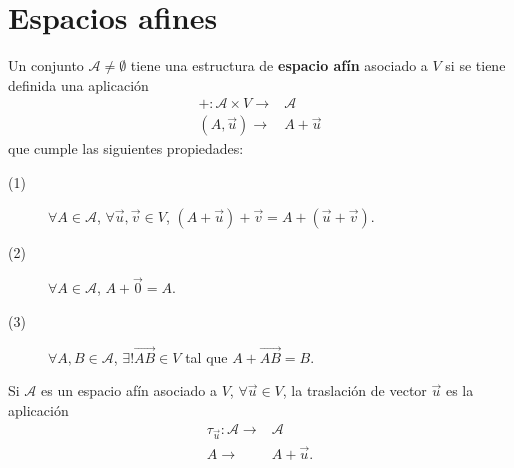 \chapter{Espacios afines}
\begin{fdefinition}
\normalfont Un conjunto $\displaystyle \mathcal{A} \neq \emptyset $ tiene una estructura de \textbf{espacio afín} asociado a $\displaystyle V $ si se tiene definida una aplicación
\[
\begin{split}
	+ : \mathcal{A} \times V \to & \mathcal{A} \\
	\left(A, \vec{u}\right) \to & A + \vec{u}
\end{split}
\]
que cumple las siguientes propiedades:
\begin{description}
\item[(1)] $\displaystyle \forall A \in \mathcal{A} $, $\displaystyle \forall \vec{u}, \vec{v} \in V $, $\displaystyle \left(A + \vec{u}\right) + \vec{v} = A + \left(\vec{u} + \vec{v}\right) $.
\item[(2)] $\displaystyle \forall A \in \mathcal{A} $, $\displaystyle A + \vec{0} = A $.
\item[(3)] $\displaystyle \forall A,B \in \mathcal{A} $, $\displaystyle \exists! \overrightarrow{AB} \in V $ tal que $\displaystyle A + \overrightarrow{AB} = B $.
\end{description}
\end{fdefinition}
\begin{observation}
\normalfont Si $\displaystyle \mathcal{A} $ es un espacio afín asociado a $\displaystyle V $, $\displaystyle \forall \vec{u} \in V $, la traslación de vector $\displaystyle \vec{u} $ es la aplicación
\[
\begin{split}
	\tau_{\vec{u}} : \mathcal{A} \to & \mathcal{A} \\
	A \to & A + \vec{u}.
\end{split}
\]
\end{observation}
